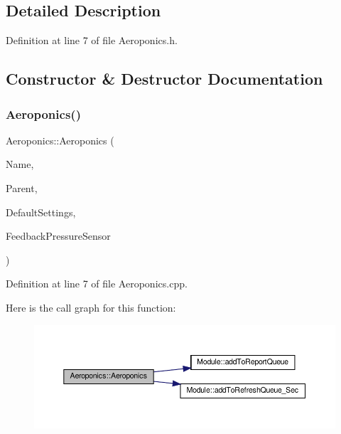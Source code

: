 \subsection{Detailed Description}


Definition at line 7 of file Aeroponics.\+h.



\subsection{Constructor \& Destructor Documentation}
\mbox{\label{class_aeroponics_aa0ded2d62059e82009548ccfa9c1f790}} 
\subsubsection{\texorpdfstring{Aeroponics()}{Aeroponics()}\hspace{0.1cm}{\footnotesize\ttfamily [1/2]}}
{\footnotesize\ttfamily Aeroponics\+::\+Aeroponics (\begin{DoxyParamCaption}\item[{const \+\_\+\+\_\+\+Flash\+String\+Helper $\ast$}]{Name,  }\item[{\hyperlink{class_module}{Module} $\ast$}]{Parent,  }\item[{\hyperlink{struct_settings_1_1_aeroponics_settings}{Settings\+::\+Aeroponics\+Settings} $\ast$}]{Default\+Settings,  }\item[{\hyperlink{class_pressure_sensor}{Pressure\+Sensor} $\ast$}]{Feedback\+Pressure\+Sensor }\end{DoxyParamCaption})}



Definition at line 7 of file Aeroponics.\+cpp.

Here is the call graph for this function\+:
\nopagebreak
\begin{figure}[H]
\begin{center}
\leavevmode
\includegraphics[width=350pt]{class_aeroponics_aa0ded2d62059e82009548ccfa9c1f790_cgraph}
\end{center}
\end{figure}
\mbox{\label{class_aeroponics_aa0ded2d62059e82009548ccfa9c1f790}} 
